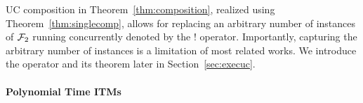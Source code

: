 UC composition in Theorem~\ref{thm:composition}, realized using Theorem~\ref{thm:singlecomp}, allows for
replacing an arbitrary number of instances of $\mathcal{F}_2$ running concurrently denoted by the $!$ operator. 
Importantly, capturing the arbitrary number of instances is a limitation of most related works. 
We introduce the operator and its theorem later in Section~\ref{sec:execuc}.



\paragraph*{\textbf{Polynomial Time ITMs}}

